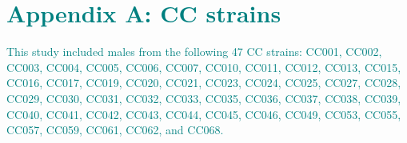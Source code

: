 \documentclass[9pt,twocolumn,twoside]{gsajnl}
\newcommand{\WV}[2]{\textcolor{red}{#1\footnote{\textcolor{red}{WV: #2}}}}
\newcommand{\GKinline}[1]{\textcolor{teal}{#1}}
\begin{document}
\section{\GKinline{Appendix A: CC strains}}

\GKinline{This study included males from the following 47 CC strains: CC001, CC002, CC003, CC004, CC005, CC006, CC007, CC010, CC011, CC012, CC013, CC015, CC016, CC017, CC019, CC020, CC021, CC023, CC024, CC025, CC027, CC028, CC029, CC030, CC031, CC032, CC033, CC035, CC036, CC037, CC038, CC039, CC040, CC041, CC042, CC043, CC044, CC045, CC046, CC049, CC053, CC055, CC057, CC059, CC061, CC062, and CC068.}





\end{document}
